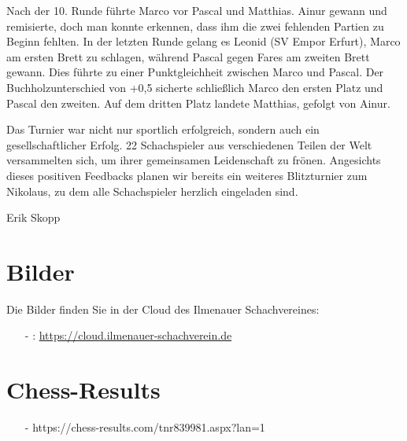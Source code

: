 \documentclass[a4paper,ngerman]{tui-algo-seminar}
\begin{document}
Nach der 10. Runde führte Marco vor Pascal und Matthias. Ainur gewann und remisierte, doch man konnte erkennen, dass ihm die zwei fehlenden Partien zu Beginn fehlten. In der letzten Runde gelang es Leonid (SV Empor Erfurt), Marco am ersten Brett zu schlagen, während Pascal gegen Fares am zweiten Brett gewann. Dies führte zu einer Punktgleichheit zwischen Marco und Pascal. Der Buchholzunterschied von +0,5 sicherte schließlich Marco den ersten Platz und Pascal den zweiten. Auf dem dritten Platz landete Matthias, gefolgt von Ainur.

Das Turnier war nicht nur sportlich erfolgreich, sondern auch ein gesellschaftlicher Erfolg. 22 Schachspieler aus verschiedenen Teilen der Welt versammelten sich, um ihrer gemeinsamen Leidenschaft zu frönen. Angesichts dieses positiven Feedbacks planen wir bereits ein weiteres Blitzturnier zum Nikolaus, zu dem alle Schachspieler herzlich eingeladen sind.

Erik Skopp

\section{Bilder}
Die Bilder finden Sie in der Cloud des Ilmenauer Schachvereines: 
\begin{itemize}
	\item[-]: \url{https://cloud.ilmenauer-schachverein.de}
\end{itemize}

\section{Chess-Results}
\begin{itemize}
	\item[-] https://chess-results.com/tnr839981.aspx?lan=1
\end{itemize}
\end{document}
